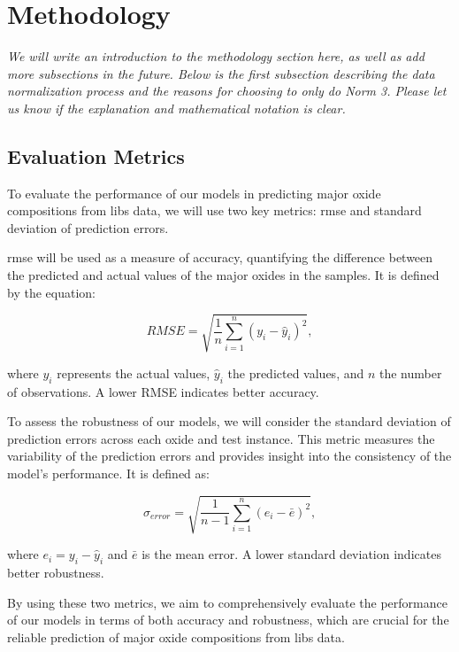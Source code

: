 \section{Methodology}\label{sec:methodology}
\textit{We will write an introduction to the methodology section here, as well as add more subsections in the future. Below is the first subsection describing the data normalization process and the reasons for choosing to only do Norm 3. Please let us know if the explanation and mathematical notation is clear.}

\subsection{Evaluation Metrics}
To evaluate the performance of our models in predicting major oxide compositions from \gls{libs} data, we will use two key metrics: \gls{rmse} and standard deviation of prediction errors.

\gls{rmse} will be used as a measure of accuracy, quantifying the difference between the predicted and actual values of the major oxides in the samples. It is defined by the equation:

\begin{equation}
    RMSE = \sqrt{\frac{1}{n} \sum_{i=1}^{n} (y_i - \hat{y}_i)^2},
\end{equation}

where $y_i$ represents the actual values, $\hat{y}_i$ the predicted values, and $n$ the number of observations. A lower RMSE indicates better accuracy.

To assess the robustness of our models, we will consider the standard deviation of prediction errors across each oxide and test instance. This metric measures the variability of the prediction errors and provides insight into the consistency of the model's performance. It is defined as:

\begin{equation}
    \sigma_{error} = \sqrt{\frac{1}{n-1} \sum_{i=1}^{n} (e_i - \bar{e})^2},
\end{equation}

where $e_i = y_i - \hat{y}_i$ and $\bar{e}$ is the mean error. A lower standard deviation indicates better robustness.

By using these two metrics, we aim to comprehensively evaluate the performance of our models in terms of both accuracy and robustness, which are crucial for the reliable prediction of major oxide compositions from \gls{libs} data.

